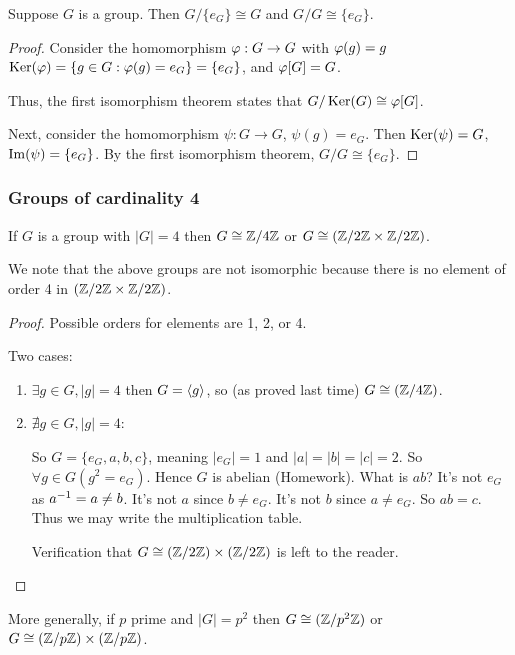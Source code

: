 \documentclass[notes.tex]{subfiles}
\begin{document}

\begin{proposition}
	Suppose $G$ is a group. Then $G/\{e_G\}\cong G$ and $G/G \cong \{e_G\}$.
\end{proposition}

\begin{proof}
	Consider the homomorphism $\varphi:G\to G$ with $\varphi(g) = g$
	$\operatorname{\mathrm{Ker}}(\varphi) = \{g\in G : \varphi(g) = e_G\} = \{e_G\}$, and $\varphi[G] = G$.

	Thus, the first isomorphism theorem states that $G/\operatorname{\mathrm{Ker}}(G)\cong \varphi[G]$.

	Next, consider the homomorphism $\psi:G\to G$, $\psi(g) = e_G$.
	Then $\operatorname{\mathrm{Ker}}(\psi) = G$, $\operatorname{\mathrm{Im}}(\psi) = \{e_G\}$. By the first isomorphism theorem, $G/G \cong \{e_G\}$.
\end{proof}

\subsubsection*{Groups of cardinality 4}

\begin{proposition}
	If $G$ is a group with $|G| = 4$ then $G \cong \mathbb{Z}/4\mathbb{Z}$ or $G\cong (\mathbb{Z}/2\mathbb{Z} \times \mathbb{Z}/2\mathbb{Z})$.
\end{proposition}
We note that the above groups are not isomorphic because there is no element of order 4 in $(\mathbb{Z}/2\mathbb{Z} \times \mathbb{Z}/2\mathbb{Z})$.

\begin{proof}
	Possible orders for elements are 1, 2, or 4.

	Two cases:
	\begin{enumerate}
		\item
		$\exists g \in G, |g| = 4$
		then $G = \left\langle{g}\right\rangle$, so (as proved last time) $G\cong(\mathbb{Z}/{4}\mathbb{Z})$.
		\item
		$\nexists g\in G, |g| = 4$:

		So $G = \{e_G, a, b,c \}$, meaning
		$|e_G| = 1$ and $|a| = |b| = |c| = 2$.
		So $\forall g\in G(g^2 = e_G)$. Hence $G$ is abelian (Homework).
		What is $ab$? It's not $e_G$ as ${a}^{-1} = a \ne b$.
		It's not $a$ since $b \ne e_G$. It's not $b$ since $a \ne e_G$.
		So $ab = c$.
		Thus we may write the multiplication table.

		Verification that $G\cong (\mathbb{Z}/{2}\mathbb{Z})\times(\mathbb{Z}/{2}\mathbb{Z})$ is left to the reader.
	\end{enumerate}
\end{proof}

\begin{remark}
	More generally, if $p$ prime and $|G| = p^2$ then $G\cong (\mathbb{Z}/{p^2}\mathbb{Z})$ or $G\cong (\mathbb{Z}/{p}\mathbb{Z})\times(\mathbb{Z}/{p}\mathbb{Z})$.
\end{remark}
\end{document}
